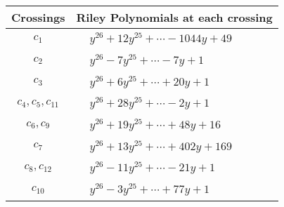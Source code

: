 \documentclass[1p]{elsarticle_modified}
\theoremstyle{definition}
\begin{document}
\begin{tabular}{m{50pt}|m{274pt}}
Crossings & \hspace{64pt}Riley Polynomials at each crossing \\
\hline $$\begin{aligned}c_{1}\end{aligned}$$&$\begin{aligned}
&y^{26}+12 y^{25}+\cdots-1044 y+49
\end{aligned}$\\
\hline $$\begin{aligned}c_{2}\end{aligned}$$&$\begin{aligned}
&y^{26}-7 y^{25}+\cdots-7 y+1
\end{aligned}$\\
\hline $$\begin{aligned}c_{3}\end{aligned}$$&$\begin{aligned}
&y^{26}+6 y^{25}+\cdots+20 y+1
\end{aligned}$\\
\hline $$\begin{aligned}c_{4},c_{5},c_{11}\end{aligned}$$&$\begin{aligned}
&y^{26}+28 y^{25}+\cdots-2 y+1
\end{aligned}$\\
\hline $$\begin{aligned}c_{6},c_{9}\end{aligned}$$&$\begin{aligned}
&y^{26}+19 y^{25}+\cdots+48 y+16
\end{aligned}$\\
\hline $$\begin{aligned}c_{7}\end{aligned}$$&$\begin{aligned}
&y^{26}+13 y^{25}+\cdots+402 y+169
\end{aligned}$\\
\hline $$\begin{aligned}c_{8},c_{12}\end{aligned}$$&$\begin{aligned}
&y^{26}-11 y^{25}+\cdots-21 y+1
\end{aligned}$\\
\hline $$\begin{aligned}c_{10}\end{aligned}$$&$\begin{aligned}
&y^{26}-3 y^{25}+\cdots+77 y+1
\end{aligned}$\\
\hline
\end{tabular}\\~\\
\end{document}
